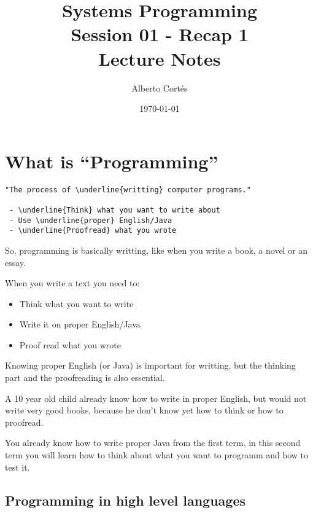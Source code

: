 \documentclass[8pt, a4paper, oneside]{extarticle}
\newcommand{\realtitle}{Session 01 - Recap 1}
\begin{document}
\title{Systems Programming\\\realtitle\\Lecture Notes}
\author{Alberto Cortés}
\date{\today}
\maketitle

\section{What is ``Programming''}

\begin{multicols}{2}
  \begin{Verbatim}
"The process of \underline{writting} computer programs."

 - \underline{Think} what you want to write about
 - Use \underline{proper} English/Java
 - \underline{Proofread} what you wrote
  \end{Verbatim}
  \columnbreak

  So, programming is basically writting,
  like when you write a book, a novel or an essay.

  When you write a text you need to:
  \begin{itemize}
    \item Think what you want to write
    \item Write it on proper English/Java
    \item Proof read what you wrote
  \end{itemize}

  Knowing proper English (or Java) is important for writting, but the thinking
  part and the proofreading is also essential.

  A 10 year old child already know how to write in proper English, but would
  not write very good books, because he don't know yet how to think or how to
  proofread.

  You already know how to write proper Java from the first term, in this second
  term you will learn how to think about what you want to programm and how to
  test it.
\end{multicols}

\subsection{Programming in high level languages}
\end{document}

